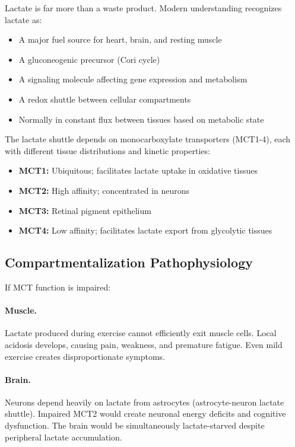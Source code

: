 Lactate is far more than a waste product. Modern understanding recognizes lactate as:

\begin{itemize}
    \item A major fuel source for heart, brain, and resting muscle
    \item A gluconeogenic precursor (Cori cycle)
    \item A signaling molecule affecting gene expression and metabolism
    \item A redox shuttle between cellular compartments
    \item Normally in constant flux between tissues based on metabolic state
\end{itemize}

The lactate shuttle depends on monocarboxylate transporters (MCT1-4), each with different tissue distributions and kinetic properties:

\begin{itemize}
    \item \textbf{MCT1:} Ubiquitous; facilitates lactate uptake in oxidative tissues
    \item \textbf{MCT2:} High affinity; concentrated in neurons
    \item \textbf{MCT3:} Retinal pigment epithelium
    \item \textbf{MCT4:} Low affinity; facilitates lactate export from glycolytic tissues
\end{itemize}

\subsection{Compartmentalization Pathophysiology}

If MCT function is impaired:

\paragraph{Muscle.} Lactate produced during exercise cannot efficiently exit muscle cells. Local acidosis develops, causing pain, weakness, and premature fatigue. Even mild exercise creates disproportionate symptoms.

\paragraph{Brain.} Neurons depend heavily on lactate from astrocytes (astrocyte-neuron lactate shuttle). Impaired MCT2 would create neuronal energy deficits and cognitive dysfunction. The brain would be simultaneously lactate-starved despite peripheral lactate accumulation.

